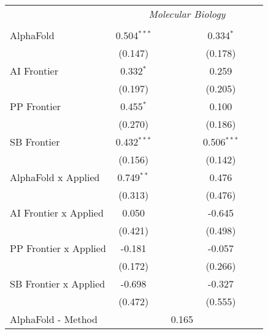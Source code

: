 \begin{tabular}{lcccccc}
 & \multicolumn{6}{c}{\textit{Molecular Biology}} \\ \\
   AlphaFold                      & 0.504$^{***}$ &         &                & 0.334$^{*}$   &        &   \\   
                                  & (0.147)       &         &                & (0.178)       &        &   \\   
   AI Frontier                    & 0.332$^{*}$   &         &                & 0.259         &        &   \\   
                                  & (0.197)       &         &                & (0.205)       &        &   \\   
   PP Frontier                    & 0.455$^{*}$   &         &                & 0.100         &        &   \\   
                                  & (0.270)       &         &                & (0.186)       &        &   \\   
   SB Frontier                    & 0.432$^{***}$ &         &                & 0.506$^{***}$ &        &   \\   
                                  & (0.156)       &         &                & (0.142)       &        &   \\   
   AlphaFold x Applied            & 0.749$^{**}$  &         &                & 0.476         &        &   \\   
                                  & (0.313)       &         &                & (0.476)       &        &   \\   
   AI Frontier x Applied          & 0.050         &         &                & -0.645        &        &   \\   
                                  & (0.421)       &         &                & (0.498)       &        &   \\   
   PP Frontier x Applied          & -0.181        &         &                & -0.057        &        &   \\   
                                  & (0.172)       &         &                & (0.266)       &        &   \\   
   SB Frontier x Applied          & -0.698        &         &                & -0.327        &        &   \\   
                                  & (0.472)       &         &                & (0.555)       &        &   \\   
   AlphaFold - Method             &               &         & 0.165          &               &        &   \\   

\end{tabular}
